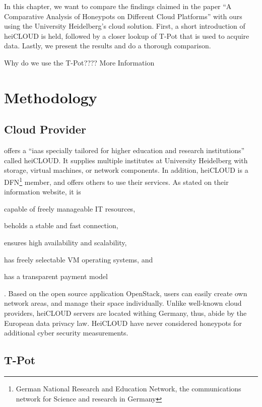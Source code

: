 In this chapter, we want to compare the findings \citet{Kelly2021} claimed in the paper \enquote{A Comparative Analysis of Honeypots on Different
    Cloud Platforms} with ours using the University Heidelberg's cloud solution.
First, a short introduction of heiCLOUD is held, followed by a closer lookup of T-Pot that is used to acquire data.
Lastly, we present the results and do a thorough comparison.

Why do we use the T-Pot???? More Information

\section{Methodology}

\subsection{Cloud Provider}

\citet{urz2021} offers a \enquote{\ac{iaas} specially tailored for higher education and research institutions} called heiCLOUD.
It supplies multiple institutes at University Heidelberg with storage, virtual machines, or network components.
In addition, heiCLOUD is a DFN\footnote{German National Research and Education Network,  the communications network for Science and research in Germany} member, and offers others to use their services.
As stated on their information website\cite{heicloud2021}, it is
\begin{enumerate*}[label=(\roman*)]
    \item capable of freely manageable IT resources,
    \item beholds a stable and fast connection,
    \item ensures high availability and scalability,
    \item has freely selectable VM operating systems, and
    \item has a transparent payment model
\end{enumerate*} \cite{heicloud2021}.
Based on the open source application OpenStack, users can easily create own network areas, and manage their space individually.
Unlike well-known cloud providers, heiCLOUD servers are located withing Germany, thus, abide by the European data privacy law.
HeiCLOUD have never considered honeypots for additional cyber security measurements.

\subsection{T-Pot}
\label{sec:tpot}

